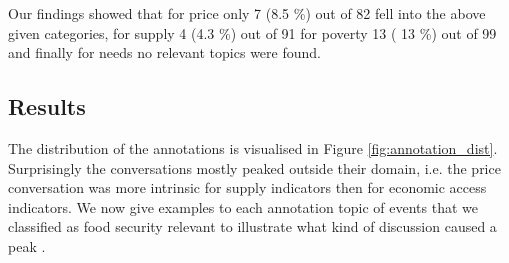 Our findings showed that for price only 7 (8.5 \%) out of 82 fell into the above given categories, for  supply 4 (4.3 \%) out of 91 for poverty 13 ( 13 \%) out of 99 and finally for needs no relevant topics were found. 


\subsection{Results}
\label{an_result}

The distribution of the annotations is visualised in Figure \ref{fig:annotation_dist}. Surprisingly the conversations mostly peaked outside their domain, i.e. the price conversation was more intrinsic for supply indicators then for economic access indicators. We now give examples to each annotation topic of events that we classified as food security relevant to illustrate what kind of discussion caused a peak . 



